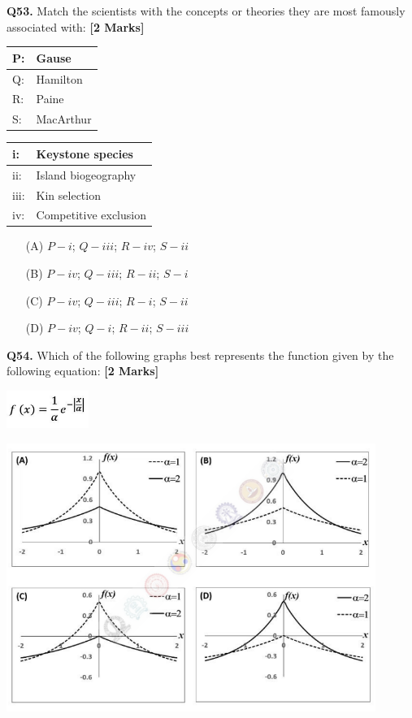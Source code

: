 \documentclass[11pt]{article}
\newcommand{\questionb}[2]{
    \noindent\textbf{Q#2.} #1 \hfill \textbf{[2 Marks]}
}
\begin{document}
\questionb{Match the scientists with the concepts or theories they are most famously associated with:}{53}
\begin{center}
\begin{tabular}{|l|l|}
\hline
P: & Gause \\ \hline
Q: & Hamilton \\ \hline
R: & Paine \\ \hline
S: & MacArthur \\ \hline
\end{tabular}
\begin{tabular}{|l|l|}
\hline
i: & Keystone species \\ \hline
ii: & Island biogeography \\ \hline
iii: & Kin selection \\ \hline
iv: & Competitive exclusion \\ \hline
\end{tabular}
\end{center}
\begin{enumerate}
    \item[(A)] $P - i$; $Q - iii$; $R - iv$; $S - ii$  
    \item[(B)] $P - iv$; $Q - iii$; $R - ii$; $S - i$  
    \item[(C)] $P - iv$; $Q - iii$; $R - i$; $S - ii$  
    \item[(D)] $P - iv$; $Q - i$; $R - ii$; $S - iii$  
\end{enumerate}
\vspace{0.5cm}

\questionb{Which of the following graphs best represents the function given by the following equation:}{54}
\begin{center}
\includegraphics[width=0.2\textwidth]{figures/54a.png}
\end{center}
\begin{center}
\includegraphics[width=0.9\textwidth]{figures/54.png}
\end{center}
\end{document}
